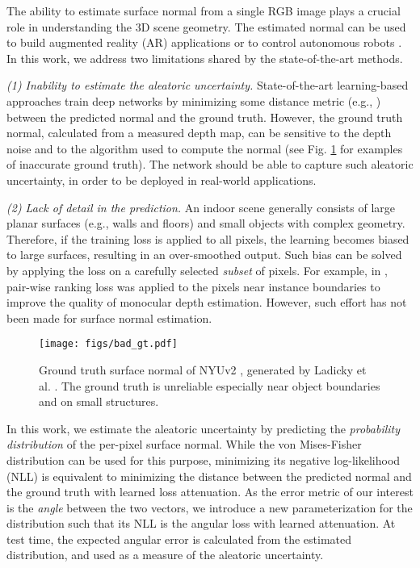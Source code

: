 \documentclass[10pt,twocolumn,letterpaper]{article}
\begin{document}
The ability to estimate surface normal from a single RGB image plays a crucial role in understanding the 3D scene geometry. The estimated normal can be used to build augmented reality (AR) applications \cite{SNfromRGB_19_FrameNet} or to control autonomous robots \cite{SN_robot2}. In this work, we address two limitations shared by the state-of-the-art methods.

\textit{(1) Inability to estimate the aleatoric uncertainty.} State-of-the-art learning-based approaches \cite{SNfromRGB_15_Deep3D,SNfromRGB_15_Eigen,SNfromRGB_16_SkipNet,SNfromRGB_18_GeoNet,SNfromRGB_19_FloorsAreFlat,SNfromRGB_19_FrameNet,SNfromRGB_19_PAP,SNfromRGB_19_SR,SNfromRGB_20_GeoNet++,SNfromRGB_20_TiltedSN,SNfromRGB_20_VPLNet} train deep networks by minimizing some distance metric (e.g., ) between the predicted normal and the ground truth. However, the ground truth normal, calculated from a measured depth map, can be sensitive to the depth noise and to the algorithm used to compute the normal (see Fig. \ref{fig:motivation} for examples of inaccurate ground truth). The network should be able to capture such aleatoric uncertainty, in order to be deployed in real-world applications.

\textit{(2) Lack of detail in the prediction.} An indoor scene generally consists of large planar surfaces (e.g., walls and floors) and small objects with complex geometry. Therefore, if the training loss is applied to all pixels, the learning becomes biased to large surfaces, resulting in an over-smoothed output. Such bias can be solved by applying the loss on a carefully selected \textit{subset} of pixels. For example, in \cite{ranking_loss_depth}, pair-wise ranking loss was applied to the pixels near instance boundaries to improve the quality of monocular depth estimation. However, such effort has not been made for surface normal estimation.

\begin{figure}[t]
\begin{center}
\texttt{[image: figs/bad\_gt.pdf]}
\end{center}
\caption{Ground truth surface normal of NYUv2 \cite{NYUv2}, generated by Ladicky et al. \cite{SNfromRGB_14_Ladicky}. The ground truth is unreliable especially near object boundaries and on small structures.}
\label{fig:motivation}
\end{figure}

In this work, we estimate the aleatoric uncertainty by predicting the \textit{probability distribution} of the per-pixel surface normal. While the von Mises-Fisher distribution \cite{fisher1993statistical} can be used for this purpose, minimizing its negative log-likelihood (NLL) is equivalent to minimizing the  distance between the predicted normal and the ground truth with learned loss attenuation. As the error metric of our interest is the \textit{angle} between the two vectors, we introduce a new parameterization for the distribution such that its NLL is the angular loss with learned attenuation. At test time, the expected angular error is calculated from the estimated distribution, and used as a measure of the aleatoric uncertainty.
\end{document}
